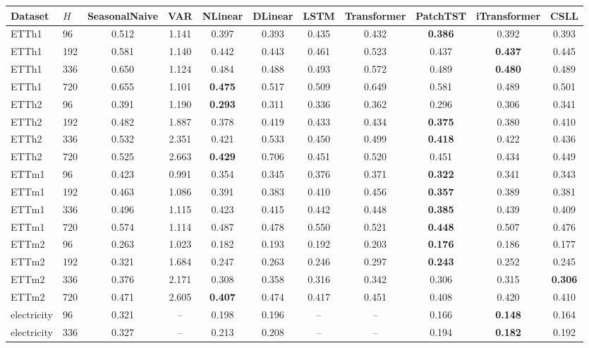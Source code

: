 \begin{tabular}{llccccccccc}
\toprule
Dataset & $H$ & SeasonalNaive & VAR & NLinear & DLinear & LSTM & Transformer & PatchTST & iTransformer & CSLL \\
\midrule
ETTh1 & 96 & 0.512 & 1.141 & 0.397 & 0.393 & 0.435 & 0.432 & \textbf{0.386} & 0.392 & 0.393 \\
ETTh1 & 192 & 0.581 & 1.140 & 0.442 & 0.443 & 0.461 & 0.523 & 0.437 & \textbf{0.437} & 0.445 \\
ETTh1 & 336 & 0.650 & 1.124 & 0.484 & 0.488 & 0.493 & 0.572 & 0.489 & \textbf{0.480} & 0.489 \\
ETTh1 & 720 & 0.655 & 1.101 & \textbf{0.475} & 0.517 & 0.509 & 0.649 & 0.581 & 0.489 & 0.501 \\
ETTh2 & 96 & 0.391 & 1.190 & \textbf{0.293} & 0.311 & 0.336 & 0.362 & 0.296 & 0.306 & 0.341 \\
ETTh2 & 192 & 0.482 & 1.887 & 0.378 & 0.419 & 0.433 & 0.434 & \textbf{0.375} & 0.380 & 0.410 \\
ETTh2 & 336 & 0.532 & 2.351 & 0.421 & 0.533 & 0.450 & 0.499 & \textbf{0.418} & 0.422 & 0.436 \\
ETTh2 & 720 & 0.525 & 2.663 & \textbf{0.429} & 0.706 & 0.451 & 0.520 & 0.451 & 0.434 & 0.449 \\
ETTm1 & 96 & 0.423 & 0.991 & 0.354 & 0.345 & 0.376 & 0.371 & \textbf{0.322} & 0.341 & 0.343 \\
ETTm1 & 192 & 0.463 & 1.086 & 0.391 & 0.383 & 0.410 & 0.456 & \textbf{0.357} & 0.389 & 0.381 \\
ETTm1 & 336 & 0.496 & 1.115 & 0.423 & 0.415 & 0.442 & 0.448 & \textbf{0.385} & 0.439 & 0.409 \\
ETTm1 & 720 & 0.574 & 1.114 & 0.487 & 0.478 & 0.550 & 0.521 & \textbf{0.448} & 0.507 & 0.476 \\
ETTm2 & 96 & 0.263 & 1.023 & 0.182 & 0.193 & 0.192 & 0.203 & \textbf{0.176} & 0.186 & 0.177 \\
ETTm2 & 192 & 0.321 & 1.684 & 0.247 & 0.263 & 0.246 & 0.297 & \textbf{0.243} & 0.252 & 0.245 \\
ETTm2 & 336 & 0.376 & 2.171 & 0.308 & 0.358 & 0.316 & 0.342 & 0.306 & 0.315 & \textbf{0.306} \\
ETTm2 & 720 & 0.471 & 2.605 & \textbf{0.407} & 0.474 & 0.417 & 0.451 & 0.408 & 0.420 & 0.410 \\
electricity & 96 & 0.321 & -- & 0.198 & 0.196 & -- & -- & 0.166 & \textbf{0.148} & 0.164 \\
electricity & 336 & 0.327 & -- & 0.213 & 0.208 & -- & -- & 0.194 & \textbf{0.182} & 0.192 \\

\end{tabular}
